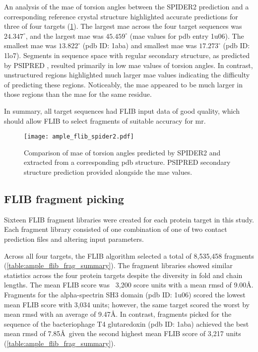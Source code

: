 An analysis of the \gls{mae} of torsion angles between the SPIDER2 \cite{Heffernan2015-bt} prediction and a corresponding reference crystal structure highlighted accurate predictions for three of four targets (\cref{fig:ample_flib_spider2}). The largest \gls{mae}\textsubscript{\textphi} across the four target sequences was $24.347^{\circ}$, and the largest \gls{mae}\textsubscript{\textpsi} was $45.459^{\circ}$ (\gls{mae} values for \gls{pdb} entry 1u06). The smallest \gls{mae}\textsubscript{\textphi} was $13.822^{\circ}$ (\gls{pdb} ID: 1aba) and smallest \gls{mae}\textsubscript{\textpsi} was $17.273^{\circ}$ (\gls{pdb} ID: 1lo7). Segments in sequence space with regular secondary structure, as predicted by PSIPRED \cite{Jones1999-ed}, resulted primarily in low \gls{mae} values of torsion angles. In contrast, unstructured regions highlighted much larger \gls{mae} values indicating the difficulty of predicting these regions. Noticeably, the \gls{mae}\textsubscript{\textpsi} appeared to be much larger in those regions than the \gls{mae}\textsubscript{\textphi} for the same residue.

In summary, all target sequences had FLIB input data of good quality, which should allow FLIB to select fragments of suitable accuracy for \gls{mr}.

\begin{figure}[H]
	\centering
	\texttt{[image: ample\_flib\_spider2.pdf]}
	\caption[SPIDER2 torsion angle prediction analysis of FLIB targets]{Comparison of \gls{mae} of torsion angles predicted by SPIDER2 \cite{Heffernan2015-bt} and extracted from a corresponding \gls{pdb} structure. PSIPRED \cite{Jones1999-ed} secondary structure prediction provided alongside the \gls{mae} values.}
	\label{fig:ample_flib_spider2}
\end{figure}

\subsection{FLIB fragment picking}
Sixteen FLIB fragment libraries were created for each protein target in this study. Each fragment library consisted of one combination of one of two contact prediction files and altering input parameters.

Across all four targets, the FLIB algorithm selected a total of 8,535,458 fragments (\cref{table:ample_flib_frag_summary}). The fragment libraries showed similar statistics across the four protein targets despite the diversity in fold and chain lengths. The mean FLIB score was ~3,200 score units with a mean \gls{rmsd} of 9.00\AA. Fragments for the alpha-spectrin SH3 domain (\gls{pdb} ID: 1u06) scored the lowest mean FLIB score with 3,034 units; however, the same target scored the worst by mean \gls{rmsd} with an average of 9.47\AA. In contrast, fragments picked for the sequence of the bacteriophage T4 glutaredoxin (\gls{pdb} ID: 1aba) achieved the best mean \gls{rmsd} of 7.85\AA\ given the second highest mean FLIB score of 3,217 units (\cref{table:ample_flib_frag_summary}).


